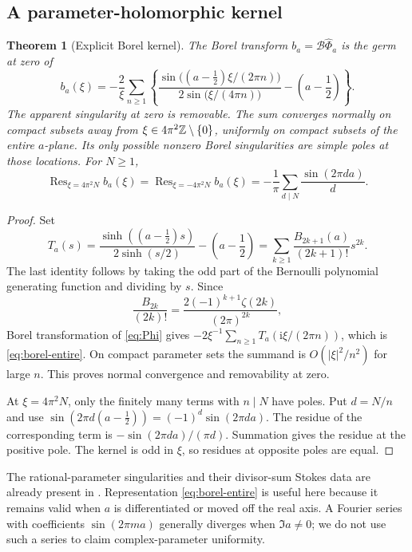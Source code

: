 \documentclass[11pt,a4paper]{article}
\numberwithin{equation}{section}
\newtheorem{theorem}{Theorem}[section]
\theoremstyle{definition}
\theoremstyle{remark}\newtheorem{remark}[theorem]{Remark}
\newcommand{\ii}{\mathrm i}\newcommand{\e}{\mathrm e}
\newcommand{\Res}{\operatorname{Res}}\newcommand{\PV}{\operatorname{PV}}
\newcommand{\Borel}{\mathcal B}\newcommand{\Lap}{\mathcal L}
\begin{document}
\subsection{A parameter-holomorphic kernel}
\begin{theorem}[Explicit Borel kernel]\label{thm:borel}
The Borel transform $b_a=\Borel\widehat\Phi_a$ is the germ at zero of
\begin{equation}\label{eq:borel-entire}
 b_a(\xi)=-\frac2\xi\sum_{n\ge1}
 \left\{
 \frac{\sin\bigl((a-\frac12)\xi/(2\pi n)\bigr)}
      {2\sin\bigl(\xi/(4\pi n)\bigr)}-
      \left(a-\frac12\right)\right\}.
\end{equation}
The apparent singularity at zero is removable. The sum converges
normally on compact subsets away from $\xi\in4\pi^2\mathbb Z\setminus\{0\}$,
uniformly on compact subsets of the entire $a$-plane. Its only possible
nonzero Borel singularities are simple poles at those locations.
For $N\ge1$,
\begin{equation}\label{eq:residues}
 \Res_{\xi=4\pi^2N}b_a(\xi)
 =\Res_{\xi=-4\pi^2N}b_a(\xi)
 =-\frac1\pi\sum_{d\mid N}\frac{\sin(2\pi da)}d.
\end{equation}
\end{theorem}
\begin{proof}
Set
\begin{equation}\label{eq:Tgen}
 T_a(s)=\frac{\sinh((a-\frac12)s)}{2\sinh(s/2)}-
       \left(a-\frac12\right)
       =\sum_{k\ge1}\frac{B_{2k+1}(a)}{(2k+1)!}s^{2k}.
\end{equation}
The last identity follows by taking the odd part of the Bernoulli
polynomial generating function and dividing by $s$.
Since
\[
 \frac{B_{2k}}{(2k)!}
 =\frac{2(-1)^{k+1}\zeta(2k)}{(2\pi)^{2k}},
\]
Borel transformation of \eqref{eq:Phi} gives
$-2\xi^{-1}\sum_{n\ge1}T_a(\ii\xi/(2\pi n))$, which is
\eqref{eq:borel-entire}. On compact parameter sets the summand is
$O(|\xi|^2/n^2)$ for large $n$. This proves normal convergence and
removability at zero.

At $\xi=4\pi^2N$, only the finitely many terms with $n\mid N$ have
poles. Put $d=N/n$ and use
$\sin(2\pi d(a-\frac12))=(-1)^d\sin(2\pi da)$.
The residue of the corresponding term is
$-\sin(2\pi da)/(\pi d)$. Summation gives the residue at the positive pole.
The kernel is odd in $\xi$, so residues at opposite poles are equal.
\end{proof}
The rational-parameter singularities and their divisor-sum Stokes data
are already present in \cite{fr}. Representation
\eqref{eq:borel-entire} is useful here because it remains valid when
$a$ is differentiated or moved off the real axis. A Fourier series with
coefficients $\sin(2\pi ma)$ generally diverges when $\Im a\ne0$;
we do not use such a series to claim complex-parameter uniformity.
\end{document}
